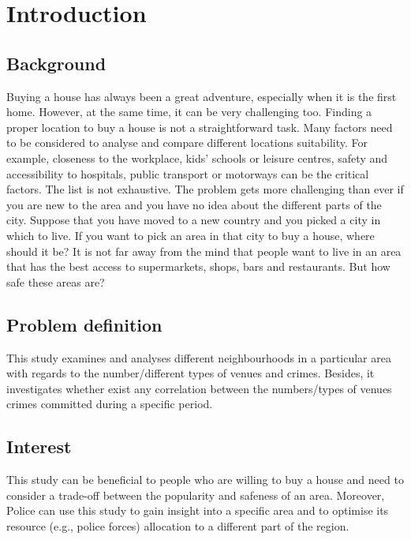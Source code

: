 \documentclass[12pt]{article}
\begin{document}
\maketitle
\section{Introduction}
\subsection{Background}
Buying a house has always been a great adventure, especially when it is the first home. However, at the same time, it can be very challenging too. Finding a proper location to buy a house is not a straightforward task. Many factors need to be considered to analyse and compare different locations suitability. For example, closeness to the workplace, kids' schools or leisure centres, safety and accessibility to hospitals, public transport or motorways can be the critical factors. The list is not exhaustive. The problem gets more challenging than ever if you are new to the area and you have no idea about the different parts of the city. Suppose that you have moved to a new country and you picked a city in which to live. If you want to pick an area in that city to buy a house, where should it be? It is not far away from the mind that people want to live in an area that has the best access to supermarkets, shops, bars and restaurants. But how safe these areas are? 
\subsection{Problem definition}
This study examines and analyses different neighbourhoods in a particular area with regards to the number/different types of venues and crimes. Besides, it investigates whether exist any correlation between the numbers/types of venues crimes committed during a specific period.

\subsection{Interest}
This study can be beneficial to people who are willing to buy a house and need to consider a trade-off between the popularity and safeness of an area. Moreover, Police can use this study to gain insight into a specific area and to optimise its resource (e.g., police forces) allocation to a different part of the region.  
\end{document}
